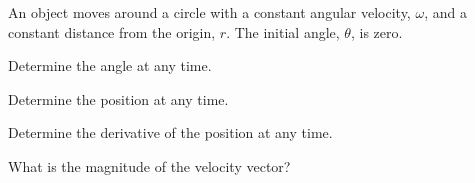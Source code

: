 \begin{problem}
\item An object moves around a circle with a constant angular
  velocity, $\omega$, and a constant distance from the origin,
  $r$. The initial angle, $\theta$, is zero.
  \begin{subproblem}
  \item Determine the angle at any time.
    \vfill
  \item Determine the position at any time.
    \vfill
  \item Determine the derivative of the position at any time.
    \vfill
  \item What is the magnitude of the velocity vector?
    \vfill
  \end{subproblem}
\end{problem}


